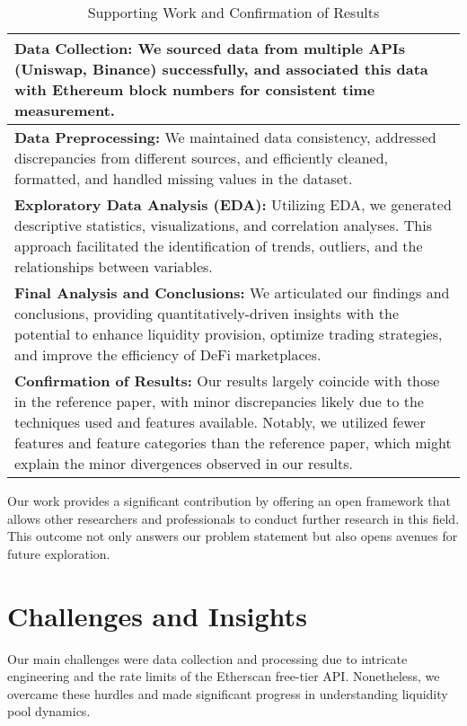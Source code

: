 \documentclass{article}
\begin{document}
  \begin{table}[htbp]
  \centering
  \small
  \begin{tabularx}{\linewidth}{|>{\raggedright\arraybackslash}X|}
  \hline
  \textbf{Data Collection:} We sourced data from multiple APIs (Uniswap, Binance) successfully, and associated this data with Ethereum block numbers for consistent time measurement. \\
  \hline
  \textbf{Data Preprocessing:} We maintained data consistency, addressed discrepancies from different sources, and efficiently cleaned, formatted, and handled missing values in the dataset. \\
  \hline
  \textbf{Exploratory Data Analysis (EDA):} Utilizing EDA, we generated descriptive statistics, visualizations, and correlation analyses. This approach facilitated the identification of trends, outliers, and the relationships between variables. \\
  \hline
  \textbf{Final Analysis and Conclusions:} We articulated our findings and conclusions, providing quantitatively-driven insights with the potential to enhance liquidity provision, optimize trading strategies, and improve the efficiency of DeFi marketplaces. \\
  \hline
  \textbf{Confirmation of Results:} Our results largely coincide with those in the reference paper, with minor discrepancies likely due to the techniques used and features available. Notably, we utilized fewer features and feature categories than the reference paper, which might explain the minor divergences observed in our results\cite{Miori2023}. \\
  \hline
  \end{tabularx}
  \caption{Supporting Work and Confirmation of Results}
  \label{fig:approach-accomplishments}
  \end{table}

Our work provides a significant contribution by offering an open framework that allows other researchers and professionals to conduct further research in this field. This outcome not only answers our problem statement but also opens avenues for future exploration\cite{Miori2022}.

\section*{\textbf{Challenges and Insights}}

Our main challenges were data collection and processing due to intricate engineering and the rate limits of the Etherscan free-tier API\cite{etherscanAPI}. Nonetheless, we overcame these hurdles and made significant progress in understanding liquidity pool dynamics\cite{Miori2022,Aigner2021,Miori2023}.
\end{document}
